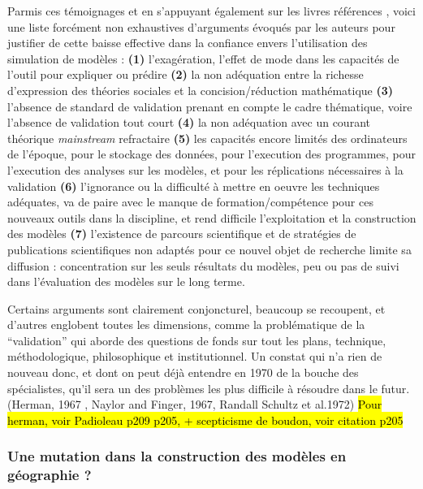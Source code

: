 Parmis ces témoignages et en s'appuyant également sur les livres références \autocite{Naylor1966,Guetzkow1972,Dutton1971}, voici une liste forcément non exhaustives d'arguments évoqués par les auteurs pour justifier de cette baisse effective dans la confiance envers l'utilisation des simulation de modèles : \textbf{(1)} l'exagération, l'effet de mode dans les capacités de l'outil pour expliquer ou prédire \textbf{(2)} la non adéquation entre la richesse d'expression des théories sociales et la concision/réduction mathématique \textbf{(3)} l'absence de standard de validation prenant en compte le cadre thématique, voire l'absence de validation tout court \textbf{(4)} la non adéquation avec un courant théorique \textit{mainstream} refractaire \textbf{(5)} les capacités encore limités des ordinateurs de l'époque, pour le stockage des données, pour l'execution des programmes, pour l'execution des analyses sur les modèles, et pour les réplications nécessaires à la validation \textbf{(6)} l'ignorance ou la difficulté à mettre en oeuvre les techniques adéquates, va de paire avec le manque de formation/compétence pour ces nouveaux outils dans la discipline, et rend difficile l'exploitation et la construction des modèles \textbf{(7)} l'existence de parcours scientifique et de stratégies de publications scientifiques non adaptés pour ce nouvel objet de recherche limite sa diffusion : concentration sur les seuls résultats du modèles, peu ou pas de suivi dans l'évaluation des modèles sur le long terme.

Certains arguments sont clairement conjoncturel, beaucoup se recoupent, et d'autres englobent toutes les dimensions, comme la problématique de la \enquote{validation} qui aborde des questions de fonds sur tout les plans, technique, méthodologique, philosophique et institutionnel. Un constat qui n'a rien de nouveau donc, et dont on peut déjà entendre en 1970 de la bouche des spécialistes, qu'il sera un des problèmes les plus difficile à résoudre dans le futur. (Herman, 1967 , Naylor and Finger, 1967, Randall Schultz et al.1972)  \hl{Pour herman, voir Padioleau p209 p205, + scepticisme de boudon, voir citation p205}


\subsubsection{Une mutation dans la construction des modèles en géographie ?}
\label{ssec:crise_mutation}

